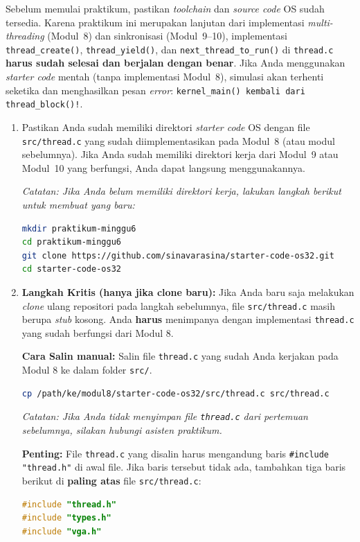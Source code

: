 Sebelum memulai praktikum, pastikan \textit{toolchain} dan \textit{source code} OS sudah tersedia.
Karena praktikum ini merupakan lanjutan dari implementasi \textit{multi-threading} (Modul~8) dan sinkronisasi (Modul~9--10), implementasi \texttt{thread\_create()}, \texttt{thread\_yield()}, dan \texttt{next\_thread\_to\_run()} di \texttt{thread.c} \textbf{harus sudah selesai dan berjalan dengan benar}. Jika Anda menggunakan \textit{starter code} mentah (tanpa implementasi Modul~8), simulasi akan terhenti seketika dan menghasilkan pesan \textit{error}: \texttt{kernel\_main() kembali dari thread\_block()!}.

\begin{enumerate}
	\item Pastikan Anda sudah memiliki direktori \textit{starter code} OS dengan file \texttt{src/thread.c} yang sudah diimplementasikan pada Modul~8 (atau modul sebelumnya). Jika Anda sudah memiliki direktori kerja dari Modul~9 atau Modul~10 yang berfungsi, Anda dapat langsung menggunakannya.

	      \textit{Catatan: Jika Anda belum memiliki direktori kerja, lakukan langkah berikut untuk membuat yang baru:}
	      \begin{lstlisting}[language=bash, caption={Membuat direktori kerja baru (opsional, jika belum punya)}]
mkdir praktikum-minggu6
cd praktikum-minggu6
git clone https://github.com/sinavarasina/starter-code-os32.git
cd starter-code-os32
    \end{lstlisting}

	\item \textbf{Langkah Kritis (hanya jika clone baru):} Jika Anda baru saja melakukan \textit{clone} ulang repositori pada langkah sebelumnya, file \texttt{src/thread.c} masih berupa \textit{stub} kosong. Anda \textbf{harus} menimpanya dengan implementasi \texttt{thread.c} yang sudah berfungsi dari Modul 8.

	      \textbf{Cara Salin manual:} Salin file \texttt{thread.c} yang sudah Anda kerjakan pada Modul 8 ke dalam folder \texttt{src/}.
	      \begin{lstlisting}[language=bash, caption={Menyalin thread.c dari direktori sebelumnya}]
cp /path/ke/modul8/starter-code-os32/src/thread.c src/thread.c
    \end{lstlisting}
	      \textit{Catatan: Jika Anda tidak menyimpan file \texttt{thread.c} dari pertemuan sebelumnya, silakan hubungi asisten praktikum.}

	      \textbf{Penting:} File \texttt{thread.c} yang disalin harus mengandung baris \texttt{\#include "thread.h"} di awal file. Jika baris tersebut tidak ada, tambahkan tiga baris berikut di \textbf{paling atas} file \texttt{src/thread.c}:
	      \begin{lstlisting}[language=C, caption={Header include yang wajib ada di awal thread.c}]
#include "thread.h"
#include "types.h"
#include "vga.h"
    \end{lstlisting}


\end{enumerate}
